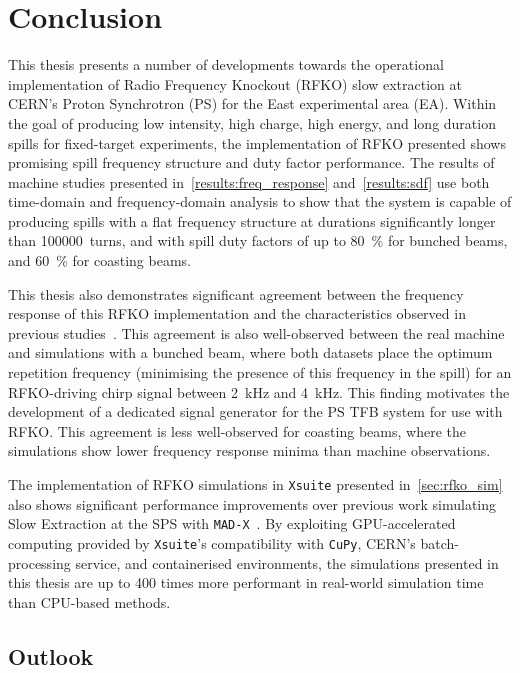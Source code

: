 \documentclass[a4paper,twoside,11pt]{report}
\begin{document}
\chapter{Conclusion}

This thesis presents a number of developments towards the operational implementation of Radio Frequency Knockout (RFKO) slow extraction at CERN's Proton Synchrotron (PS) for the East experimental area (EA). Within the goal of producing low intensity, high charge, high energy, and long duration spills for fixed-target experiments, the implementation of RFKO presented shows promising spill frequency structure and duty factor performance. The results of machine studies presented in~\autoref{results:freq_response} and~\autoref{results:sdf} use both time-domain and frequency-domain analysis to show that the system is capable of producing spills with a flat frequency structure at durations significantly longer than \qty{100000}{turns}, and with spill duty factors of up to \qty{80}{\percent} for bunched beams, and \qty{60}{\percent} for coasting beams.

This thesis also demonstrates significant agreement between the frequency response of this RFKO implementation and the characteristics observed in previous studies~\cite{wepmp008,Pari:2780495}. This agreement is also well-observed between the real machine and simulations with a bunched beam, where both datasets place the optimum repetition frequency (minimising the presence of this frequency in the spill) for an RFKO-driving chirp signal between \qty{2}{\kilo\hertz} and \qty{4}{\kilo\hertz}. This finding motivates the development of a dedicated signal generator for the PS TFB system for use with RFKO. 
This agreement is less well-observed for coasting beams, where the simulations show lower frequency response minima than machine observations. 

The implementation of RFKO simulations in \verb|Xsuite| presented in~\autoref{sec:rfko_sim} also shows significant performance improvements over previous work simulating Slow Extraction at the SPS with \verb|MAD-X|~\cite{Schicho:2039579}. By exploiting GPU-accelerated computing provided by \verb|Xsuite|'s compatibility with \verb|CuPy|, CERN's batch-processing service, and containerised environments, the simulations presented in this thesis are up to 400 times more performant in real-world simulation time than CPU-based methods.

\section{Outlook}
\end{document}
